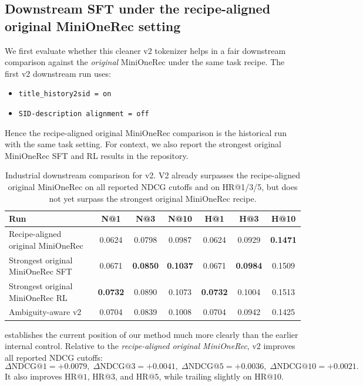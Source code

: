 \subsection{Downstream SFT under the recipe-aligned original MiniOneRec setting}

We first evaluate whether this cleaner v2 tokenizer helps in a fair downstream comparison against the \emph{original} MiniOneRec under the same task recipe. The first v2 downstream run uses:
\begin{itemize}[leftmargin=1.4em]
  \item \texttt{title\_history2sid = on}
  \item \texttt{SID-description alignment = off}
\end{itemize}
Hence the recipe-aligned original MiniOneRec comparison is the historical run with the same task setting. For context, we also report the strongest original MiniOneRec SFT and RL results in the repository.

\begin{table}[t]
  \centering
  \caption{Industrial downstream comparison for v2. V2 already surpasses the recipe-aligned original MiniOneRec on all reported NDCG cutoffs and on HR@1/3/5, but does not yet surpass the strongest original MiniOneRec recipe.}
  \label{tab:v2sft}
  \begin{tabular}{lcccccc}
    \toprule
    Run & N@1 & N@3 & N@10 & H@1 & H@3 & H@10 \\
    \midrule
    Recipe-aligned original MiniOneRec & 0.0624 & 0.0798 & 0.0987 & 0.0624 & 0.0929 & \textbf{0.1471} \\
    Strongest original MiniOneRec SFT & 0.0671 & \textbf{0.0850} & \textbf{0.1037} & 0.0671 & \textbf{0.0984} & 0.1509 \\
    Strongest original MiniOneRec RL & \textbf{0.0732} & 0.0890 & 0.1073 & \textbf{0.0732} & 0.1004 & 0.1513 \\
    Ambiguity-aware v2 & 0.0704 & 0.0839 & 0.1008 & 0.0704 & 0.0942 & 0.1425 \\
    \bottomrule
  \end{tabular}
\end{table}

 establishes the current position of our method much more clearly than the earlier internal control. Relative to the \emph{recipe-aligned original MiniOneRec}, v2 improves all reported NDCG cutoffs:
\[
\Delta \mathrm{NDCG}@1 = +0.0079,\;
\Delta \mathrm{NDCG}@3 = +0.0041,\;
\Delta \mathrm{NDCG}@5 = +0.0036,\;
\Delta \mathrm{NDCG}@10 = +0.0021.
\]
It also improves $\mathrm{HR}@1$, $\mathrm{HR}@3$, and $\mathrm{HR}@5$, while trailing slightly on $\mathrm{HR}@10$.

